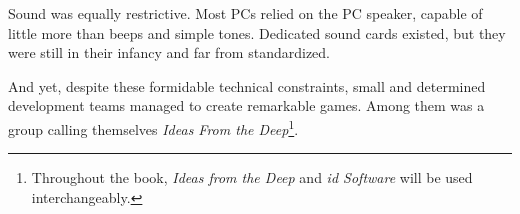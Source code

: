 \documentclass[book.tex]{subfiles}
\begin{document}
\par
Sound was equally restrictive. Most PCs relied on the PC speaker, capable of little more than beeps and simple tones. Dedicated sound cards existed, but they were still in their infancy and far from standardized.\\

\par
And yet, despite these formidable technical constraints, small and determined development teams managed to create remarkable games. Among them was a group calling themselves \textit{Ideas From the Deep}\footnote{Throughout the book, \textit{Ideas from the Deep} and \textit{id Software} will be used interchangeably.}.
\end{document}
